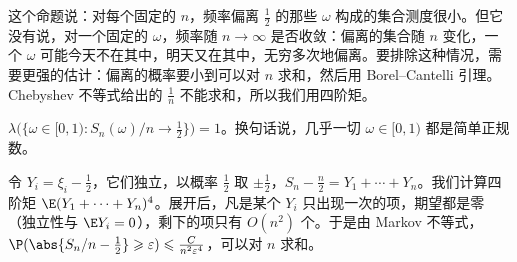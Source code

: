 这个命题说：对每个固定的 $n$，频率偏离 $\frac12$ 的那些 $\omega$ 构成的集合测度很小。但它没有说，对一个固定的 $\omega$，频率随 $n\to\infty$ 是否收敛：偏离的集合随 $n$ 变化，一个 $\omega$ 可能今天不在其中，明天又在其中，无穷多次地偏离。要排除这种情况，需要更强的估计：偏离的概率要小到可以对 $n$ 求和，然后用 Borel--Cantelli 引理。Chebyshev 不等式给出的 $\frac1n$ 不能求和，所以我们用四阶矩。

\begin{theorem}\label{thm:independence:borel-normal}
$\lambda\bigl(\{\omega\in[0,1):S_n(\omega)/n\to\frac12\}\bigr)=1$。换句话说，几乎一切 $\omega\in[0,1)$ 都是简单正规数。
\end{theorem}

\begin{remark}[证明思路]
令 $Y_i=\xi_i-\frac12$，它们独立，以概率 $\frac12$ 取 $\pm\frac12$，$S_n-\frac n2=Y_1+\cdots+Y_n$。我们计算四阶矩 $\E(Y_1+\cdots+Y_n)^4$。展开后，凡是某个 $Y_i$ 只出现一次的项，期望都是零（独立性与 $\E Y_i=0$），剩下的项只有 $O(n^2)$ 个。于是由 Markov 不等式，$\P(\abs{S_n/n-\frac12}\geqslant\varepsilon)\leqslant\frac C{n^2\varepsilon^4}$，可以对 $n$ 求和。
\end{remark}

